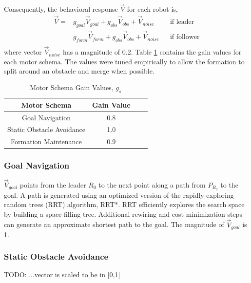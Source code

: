\documentclass[letterpaper, 10 pt, conference]{ieeeconf}  %
\begin{document}
	Consequently, the behavioral response $\vec{V}$ for each robot is,
	\begin{equation*}
	\begin{aligned}
	\vec{V} = & g_{goal} \vec{V}_{goal} + g_{obs} \vec{V}_{obs} + \vec{V}_{noise}        && \text{if leader}\\
	& g_{form} \vec{V}_{form} + g_{obs} \vec{V}_{obs} + \vec{V}_{noise}       && \text{if follower}\\
	\end{aligned}
	\end{equation*}
	where vector $\vec{V}_{noise}$ has a magnitude of 0.2. Table \ref{motor_schema_gs} contains the gain values for each motor schema. The values were tuned empirically to allow the formation to split around an obstacle and merge when possible.
	
	\begin{table}[h]
		\begin{center}
			\begin{tabular}{|c|c|c c|}
				\hline
				Motor Schema & Gain Value \\
				\hline
				Goal Navigation                & 0.8 \\
				Static Obstacle Avoidance   & 1.0 \\
				Formation Maintenance      & 0.9 \\
				\hline
			\end{tabular}
		\end{center}
		\caption{Motor Schema Gain Values, $g_s$}
		\label{motor_schema_gs}
	\end{table}
	
	\subsubsection*{Goal Navigation}
	
	$\vec{V}_{goal}$ points from the leader $R_0$ to the next point along a path from $P_{R_0}$ to the goal. A path is generated using an optimized version of the rapidly-exploring random trees (RRT) algorithm, RRT*. RRT efficiently explores the search space by building a space-filling tree. Additional rewiring and cost minimization steps can generate an approximate shortest path to the goal. The magnitude of $\vec{V}_{goal}$ is 1.
	
	\subsubsection*{Static Obstacle Avoidance}
	TODO: ...vector is scaled to be in [0,1]
	
\end{document}

